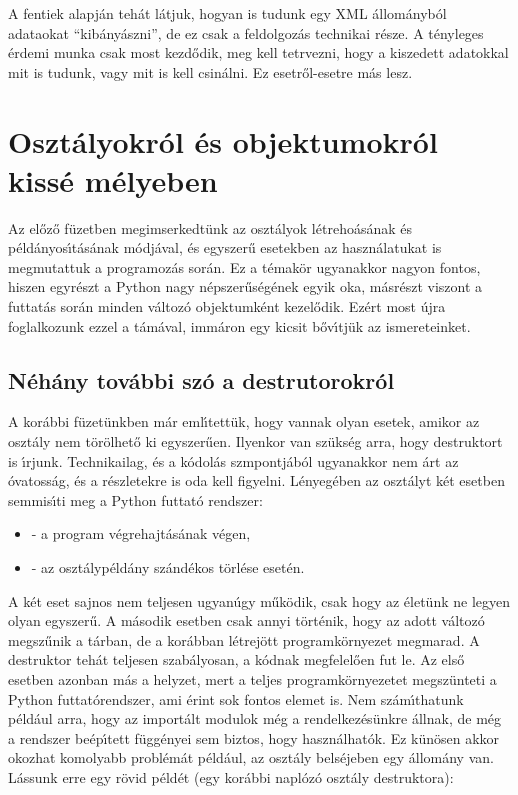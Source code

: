 \noindent A fentiek alapj\'an teh\'at l\'atjuk, hogyan is tudunk egy XML \'allom\'anyb\'ol adataokat
``kib\'any\'aszni'', de ez csak a feldolgoz\'as technikai r\'esze. A t\'enyleges \'erdemi munka 
csak most kezd\H{o}dik, meg kell tetrvezni, hogy a kiszedett adatokkal mit is tudunk, vagy mit is kell 
csin\'alni. Ez esetr\H{o}l-esetre m\'as lesz.

\section{Oszt\'alyokr\'ol \'es objektumokr\'ol kiss\'e m\'elyeben}

Az el\H{o}z\H{o} f\"uzetben megimserkedt\"unk az oszt\'alyok l\'etreho\'as\'anak \'es 
p\'eld\'anyo\-s\'{\i}\-t\'a\-s\'a\-nak m\'odj\'aval, \'es egyszer\H{u} esetekben az 
haszn\'alatukat is megmutattuk a programoz\'as sor\'an. Ez a t\'emak\"or ugyanakkor nagyon 
fontos, hiszen egyr\'eszt a Python nagy n\'epszer\H{u}s\'eg\'enek egyik oka, m\'asr\'eszt 
viszont a futtat\'as sor\'an minden v\'altoz\'o objektumk\'ent kezel\H{o}dik. Ez\'ert most 
\'ujra foglalkozunk ezzel a t\'am\'aval, imm\'aron egy kicsit b\H{o}v\'{\i}tj\"uk az ismereteinket. 

\subsection{N\'eh\'any tov\'abbi sz\'o a destrutorokr\'ol}
 \label{destruktor}

A kor\'abbi f\"uzet\"unkben m\'ar eml\'{\i}tett\"uk, hogy vannak olyan esetek, amikor az oszt\'aly 
nem t\"or\"olhet\H{o} ki egyszer\H{u}en. Ilyenkor van sz\"uks\'eg arra, hogy destruktort is \'{\i}rjunk. 
Technikailag, \'es a k\'odol\'as szmpontj\'ab\'ol ugyanakkor nem \'art az \'ovatoss\'ag, \'es a 
r\'eszletekre is oda kell figyelni. L\'enyeg\'eben az oszt\'alyt k\'et esetben semmis\'{\i}ti meg 
a Python futtat\'o rendszer:

\begin{itemize}
\item{- a program v\'egrehajt\'as\'anak v\'egen,}
\item{- az oszt\'alyp\'eld\'any sz\'and\'ekos t\"orl\'ese eset\'en.}
\end{itemize}

\noindent A k\'et eset sajnos nem teljesen ugyan\'ugy m\H{u}k\"odik, csak hogy az \'elet\"unk ne 
legyen olyan egyszer\H{u}. A m\'asodik esetben csak annyi t\"ort\'enik, hogy az adott v\'altoz\'o 
megsz\H{u}nik a t\'arban, de a kor\'abban l\'etrej\"ott programk\"ornyezet megmarad. A destruktor 
teh\'at teljesen szab\'alyosan, a k\'odnak megfelel\H{o}en fut le. Az els\H{o} esetben azonban 
m\'as a helyzet, mert a teljes programk\"ornyezetet megsz\"unteti a Python futtat\'orendszer, 
ami \'erint sok fontos elemet is. Nem sz\'am\'{\i}thatunk p\'eld\'aul arra, hogy az import\'alt 
modulok m\'eg a rendelkez\'es\"unkre \'allnak, de m\'eg a rendszer be\'ep\'{\i}tett f\"ugg\'enyei 
sem biztos, hogy haszn\'alhat\'ok. Ez k\"un\"osen akkor okozhat komolyabb probl\'em\'at p\'eld\'aul, 
az oszt\'aly bels\'ejeben egy \'allom\'any van. L\'assunk erre egy r\"ovid p\'eld\'et (egy kor\'abbi 
napl\'oz\'o oszt\'aly destruktora): 

